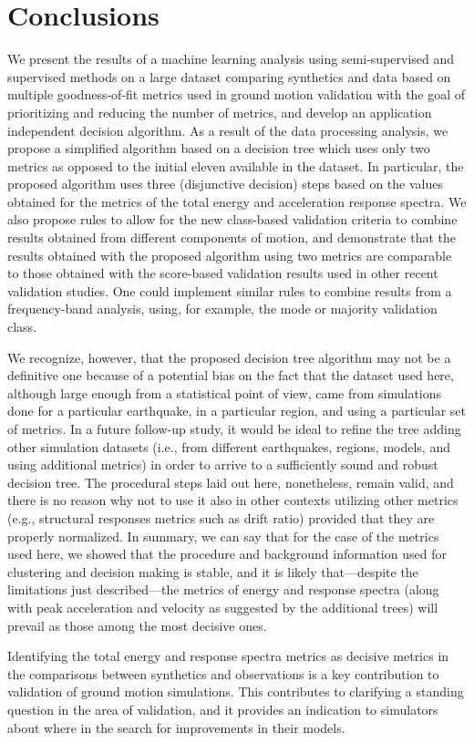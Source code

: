 
\section{Conclusions}

We present the results of a machine learning analysis using semi-supervised and supervised methods on a large dataset comparing synthetics and data based on multiple goodness-of-fit metrics used in ground motion validation with the goal of prioritizing and reducing the number of metrics, and develop an application independent decision algorithm. As a result of the data processing analysis, we propose a simplified algorithm based on a decision tree which uses only two metrics as opposed to the initial eleven available in the dataset. In particular, the proposed algorithm uses three (disjunctive decision) steps based on the values obtained for the metrics of the total energy and acceleration response spectra. We also propose rules to allow for the new class-based validation criteria to combine results obtained from different components of motion, and demonstrate that the results obtained with the proposed algorithm using two metrics are comparable to those obtained with the score-based validation results used in other recent validation studies. One could implement similar rules to combine results from a frequency-band analysis, using, for example, the mode or majority validation class. 

We recognize, however, that the proposed decision tree algorithm may not be a definitive one because of a potential bias on the fact that the dataset used here, although large enough from a statistical point of view, came from simulations done for a particular earthquake, in a particular region, and using a particular set of metrics. In a future follow-up study, it would be ideal to refine the tree adding other simulation datasets (i.e., from different earthquakes, regions, models, and using additional metrics) in order to arrive to a sufficiently sound and robust decision tree. The procedural steps laid out here, nonetheless, remain valid, and there is no reason why not to use it also in other contexts utilizing other metrics (e.g., structural responses metrics such as drift ratio) provided that they are properly normalized. In summary, we can say that for the case of the metrics used here, we showed that the procedure and background information used for clustering and decision making is stable, and it is likely that---despite the limitations just described---the metrics of energy and response spectra (along with peak acceleration and velocity as suggested by the additional trees) will prevail as those among the most decisive ones.

Identifying the total energy and response spectra metrics as decisive metrics in the comparisons between synthetics and observations is a key contribution to validation of ground motion simulations. This contributes to clarifying a standing question in the area of validation, and it provides an indication to simulators about where  in the search for improvements in their models.
